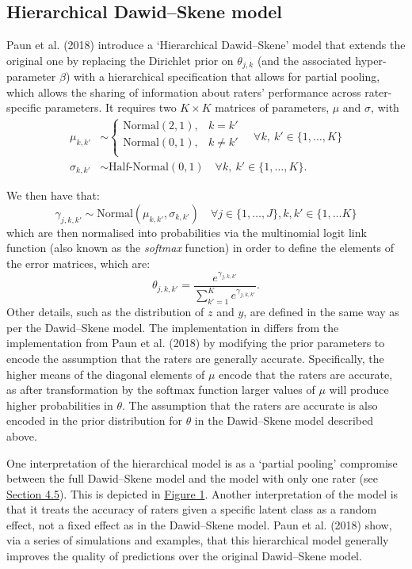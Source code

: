 \hypertarget{hierarchical-dawidskene-model}{%
\subsection{Hierarchical Dawid--Skene model}\label{hierarchical-dawidskene-model}}

Paun et al. (2018) introduce a `Hierarchical Dawid--Skene' model that extends the
original one by replacing the Dirichlet prior on \(\theta_{j,k}\) (and the
associated hyper-parameter \(\beta\)) with a hierarchical specification
that allows for partial pooling, which allows the sharing of information about
raters' performance across rater-specific parameters. It requires two
\(K \times K\) matrices of parameters, \(\mu\) and \(\sigma\), with
\[
\begin{aligned}
\mu_{k, k'} &\sim \begin{cases}
    \textrm{Normal}(2, 1), & k = k' \\
    \textrm{Normal}(0, 1), & k \neq k' \\
    \end{cases}
    \quad \forall k, \ k' \in \{1, \dots, K\} \\
\sigma_{k, k'} &\sim \textrm{Half-Normal}(0, 1)
    \quad \forall k, \ k' \in \{1, \dots, K\}.
\end{aligned}
\]

We then have that:
\[
\gamma_{j, k, k'} \sim \textrm{Normal}(\mu_{k, k'}, \sigma_{k, k'})
    \quad \forall
    j \in \{1, \dots, J\},
    k, k' \in \{1, \dots K\}
\]
which are then normalised into probabilities via the multinomial logit
link function (also known as the \emph{softmax} function) in order to define
the elements of the error matrices, which are:
\[
\theta_{j, k, k'}
    = \frac{e^{\gamma_{j, k, k'}}}{\sum_{k'=1}^K e^{\gamma_{j, k, k'}}}.
\]
Other details, such as the distribution of \(z\) and \(y\), are defined in
the same way as per the Dawid--Skene model. The implementation in
 differs from the
implementation from Paun et al. (2018) by modifying the prior parameters to
encode the assumption that the raters are generally accurate.
Specifically, the higher means of the diagonal elements of \(\mu\) encode
that the raters are accurate, as after transformation by the softmax
function larger values of \(\mu\) will produce higher probabilities in
\(\theta\). The assumption that the raters are accurate is also encoded in
the prior distribution for \(\theta\) in the Dawid--Skene model described
above.

One interpretation of the hierarchical model is as a `partial pooling'
compromise between the full Dawid--Skene model and the model with only
one rater (see \protect\hyperlink{sec:homogenous}{Section 4.5}). This is depicted in
\protect\hyperlink{fig:relationships}{Figure 1}. Another interpretation of the model is that it
treats the accuracy of raters given a specific latent class as a random
effect, not a fixed effect as in the Dawid--Skene model. Paun et al. (2018) show,
via a series of simulations and examples, that this hierarchical model
generally improves the quality of predictions over the original
Dawid--Skene model.


